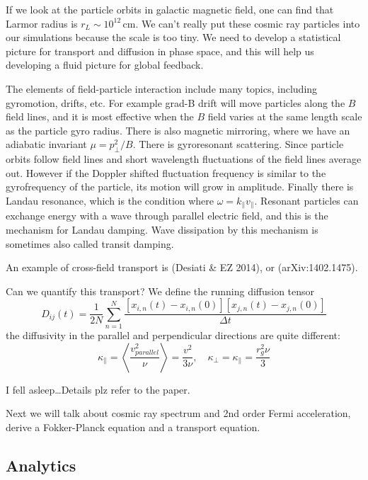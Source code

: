 \documentclass[letterpaper, 11pt]{article}
\numberwithin{equation}{section}
\numberwithin{figure}{section}
\begin{document}
If we look at the particle orbits in galactic magnetic field, one can find that
Larmor radius is $r_L\sim 10^{12}\,\mathrm{cm}$. We can't really put these
cosmic ray particles into our simulations because the scale is too tiny. We need
to develop a statistical picture for transport and diffusion in phase space, and
this will help us developing a fluid picture for global feedback.

The elements of field-particle interaction include many topics, including
gyromotion, drifts, etc. For example grad-B drift will move particles along the
$B$ field lines, and it is most effective when the $B$ field varies at the same
length scale as the particle gyro radius. There is also magnetic mirroring,
where we have an adiabatic invariant $\mu = p_{\perp}^2/B$. There is
gyroresonant scattering. Since particle orbits follow field lines and short
wavelength fluctuations of the field lines average out. However if the
Doppler shifted fluctuation frequency is similar to the gyrofrequency of the
particle, its motion will grow in amplitude. Finally there is Landau resonance,
which is the condition where $\omega = k_{\parallel}v_{\parallel}$. Resonant
particles can exchange energy with a wave through parallel electric field, and
this is the mechanism for Landau damping. Wave dissipation by this mechanism is
sometimes also called transit damping.

An example of cross-field transport is (Desiati \& EZ 2014), or
(arXiv:1402.1475).

Can we quantify this transport? We define the running diffusion tensor
\begin{equation}
  \label{eq:2}
  D_{ij}(t) = \frac{1}{2N}\sum_{n=1}^N\frac{\left[ x_{i,n}(t) - x_{i,n}(0) \right][x_{j,n}(t) - x_{j,n}(0)]}{\Delta t}
\end{equation}
the diffusivity in the parallel and perpendicular directions are quite
different:
\begin{equation}
  \label{eq:3}
  \kappa_{\parallel} = \left\langle \frac{v_{parallel}^2}{\nu} \right\rangle = \frac{v^2}{3\nu} ,\quad \kappa_{\perp} = \kappa_{\parallel} = \frac{r_g^2\nu}{3}
\end{equation}

I fell asleep\dots Details plz refer to the paper.

Next we will talk about cosmic ray spectrum and 2nd order Fermi acceleration,
derive a Fokker-Planck equation and a transport equation.

\subsection{Analytics}
\end{document}
